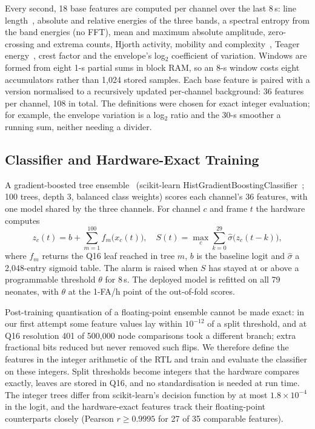 \documentclass[conference]{IEEEtran}
\begin{document}
Every second, 18 base features are computed per channel over the last 8\,s: line length~\cite{esteller2001}, absolute and relative energies of the three bands, a spectral entropy from the band energies (no FFT), mean and maximum absolute amplitude, zero-crossing and extrema counts, Hjorth activity, mobility and complexity~\cite{hjorth1970}, Teager energy~\cite{kaiser1990}, crest factor and the envelope's log$_2$ coefficient of variation. Windows are formed from eight 1-s partial sums in block RAM, so an 8-s window costs eight accumulators rather than 1,024 stored samples. Each base feature is paired with a version normalised to a recursively updated per-channel background: 36 features per channel, 108 in total. The definitions were chosen for exact integer evaluation; for example, the envelope variation is a log$_2$ ratio and the 30-s smoother a running sum, neither needing a divider.

\subsection{Classifier and Hardware-Exact Training}

A gradient-boosted tree ensemble~\cite{friedman2001} (scikit-learn HistGradientBoostingClassifier~\cite{pedregosa2011}; 100 trees, depth 3, balanced class weights) scores each channel's 36 features, with one model shared by the three channels. For channel $c$ and frame $t$ the hardware computes
\begin{equation}
z_c(t) = b + \sum_{m=1}^{100} f_m\bigl(x_c(t)\bigr),\quad
S(t) = \max_{c} \sum_{k=0}^{29} \hat\sigma\bigl(z_c(t-k)\bigr),
\end{equation}
where $f_m$ returns the Q16 leaf reached in tree $m$, $b$ is the baseline logit and $\hat\sigma$ a 2,048-entry sigmoid table. The alarm is raised when $S$ has stayed at or above a programmable threshold $\theta$ for 8\,s. The deployed model is refitted on all 79 neonates, with $\theta$ at the 1-FA/h point of the out-of-fold scores.

Post-training quantisation of a floating-point ensemble cannot be made exact: in our first attempt some feature values lay within $10^{-12}$ of a split threshold, and at Q16 resolution 401 of 500,000 node comparisons took a different branch; extra fractional bits reduced but never removed such flips. We therefore define the features in the integer arithmetic of the RTL and train and evaluate the classifier on these integers. Split thresholds become integers that the hardware compares exactly, leaves are stored in Q16, and no standardisation is needed at run time. The integer trees differ from scikit-learn's decision function by at most $1.8\times10^{-4}$ in the logit, and the hardware-exact features track their floating-point counterparts closely (Pearson $r \ge 0.9995$ for 27 of 35 comparable features).
\end{document}
